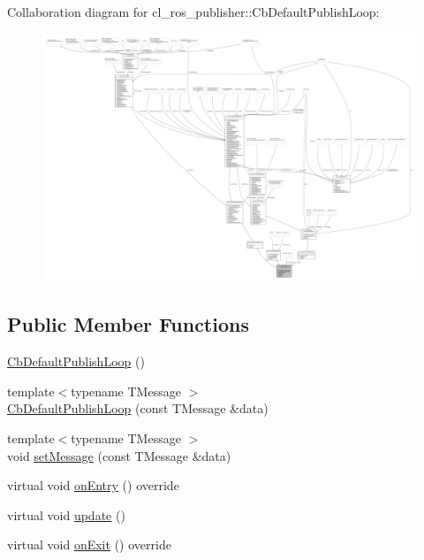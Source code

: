 Collaboration diagram for cl\+\_\+ros\+\_\+publisher\+:\+:Cb\+Default\+Publish\+Loop\+:
\nopagebreak
\begin{figure}[H]
\begin{center}
\leavevmode
\includegraphics[width=350pt]{classcl__ros__publisher_1_1CbDefaultPublishLoop__coll__graph}
\end{center}
\end{figure}
\subsection*{Public Member Functions}
\begin{DoxyCompactItemize}
\item 
\hyperlink{classcl__ros__publisher_1_1CbDefaultPublishLoop_a6453198599bad62306f4246f6ac725b5}{Cb\+Default\+Publish\+Loop} ()
\item 
{\footnotesize template$<$typename T\+Message $>$ }\\\hyperlink{classcl__ros__publisher_1_1CbDefaultPublishLoop_a41c35ec9ece9d457aa31efccfe4666c6}{Cb\+Default\+Publish\+Loop} (const T\+Message \&data)
\item 
{\footnotesize template$<$typename T\+Message $>$ }\\void \hyperlink{classcl__ros__publisher_1_1CbDefaultPublishLoop_a0377d84fde4cd1193abe5daf172359a7}{set\+Message} (const T\+Message \&data)
\item 
virtual void \hyperlink{classcl__ros__publisher_1_1CbDefaultPublishLoop_a6e6cfb477cbefc510ca7b55a061545e4}{on\+Entry} () override
\item 
virtual void \hyperlink{classcl__ros__publisher_1_1CbDefaultPublishLoop_aef241d1976f0105643976545880d5e21}{update} ()
\item 
virtual void \hyperlink{classcl__ros__publisher_1_1CbDefaultPublishLoop_a206c6bc09e7c6414304b679ec415c19f}{on\+Exit} () override
\end{DoxyCompactItemize}
